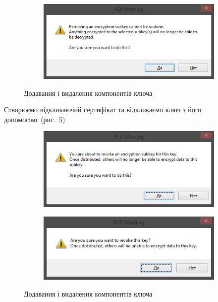 \documentclass[
	a4paper,
	oneside,
	BCOR = 10mm,
	DIV = 12,
	12pt,
	headings = normal,
]{scrartcl}
\newlength{\gridunitwidth}
\begin{document}
\begin{figure}[!htbp]
\begin{subfigure}[b]{9 \gridunitwidth - 1em / (2-1)}
				\includegraphics[width = \columnwidth]{./assets/p22.png}
				\caption{}
				\label{subfig:remove-subkey}
			\end{subfigure}
			\caption{Додавання і видалення компонентів ключа}
			\label{fig:add-key-components}
		\end{figure}

		Створюємо відкликаючий сертифікат та відкликаємо ключ з його допомогою~(рис.~\ref{fig:revocation}).

		\begin{figure}[!htbp]
			\centering
			\begin{subfigure}[b]{8 \gridunitwidth - 1em / (2-1)}
				\includegraphics[width = \columnwidth]{./assets/p23.png}
				\caption{}
				\label{subfig:revoke-subkey}
			\end{subfigure}
			\begin{subfigure}[b]{8 \gridunitwidth - 1em / (2-1)}
				\includegraphics[width = \columnwidth]{./assets/p24.png}
				\caption{}
				\label{subfig:revoke-key}
			\end{subfigure}
			\caption{Додавання і видалення компонентів ключа}
			\label{fig:revocation}
		\end{figure}
\end{document}
